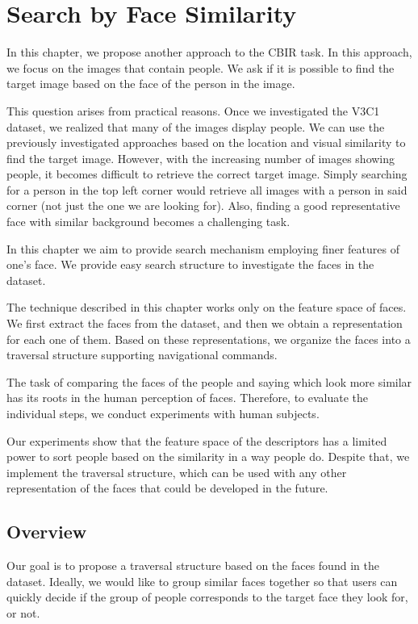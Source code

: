 \chapter{Search by Face Similarity}
\label{ch:face_search}

In this chapter, we propose another approach to the CBIR task. In this approach, we focus on the images that contain people. We ask if it is possible to find the target image based on the face of the person in the image.

This question arises from practical reasons. Once we investigated the V3C1 dataset, we realized that many of the images display people. We can use the previously investigated approaches based on the location and visual similarity to find the target image. However, with the increasing number of images showing people, it becomes difficult to retrieve the correct target image. Simply searching for a person in the top left corner would retrieve all images with a person in said corner (not just the one we are looking for). Also, finding a good representative face with similar background becomes a challenging task.

In this chapter we aim to provide search mechanism employing finer features of one's face. We provide easy search structure to investigate the faces in the dataset.

The technique described in this chapter works only on the feature space of faces. We first extract the faces from the dataset, and then we obtain a representation for each one of them. Based on these representations, we organize the faces into a traversal structure supporting navigational commands.

The task of comparing the faces of the people and saying which look more similar has its roots in the human perception of faces. Therefore, to evaluate the individual steps, we conduct experiments with human subjects.

Our experiments show that the feature space of the descriptors has a limited power to sort people based on the similarity in a way people do. Despite that, we implement the traversal structure, which can be used with any other representation of the faces that could be developed in the future.


\section{Overview}

Our goal is to propose a traversal structure based on the faces found in the dataset. Ideally, we would like to group similar faces together so that users can quickly decide if the group of people corresponds to the target face they look for, or not.


